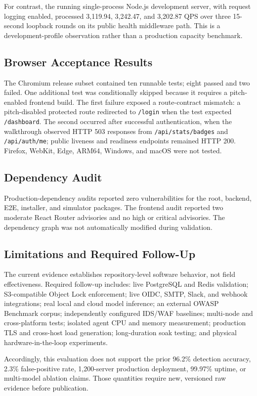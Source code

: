 For contrast, the running single-process Node.js development server, with request logging enabled, processed 3,119.94, 3,242.47, and 3,202.87 QPS over three 15-second loopback rounds on its public health middleware path. This is a development-profile observation rather than a production capacity benchmark.

\subsection{Browser Acceptance Results}
\label{subsec:browser-results}

The Chromium release subset contained ten runnable tests; eight passed and two failed. One additional test was conditionally skipped because it requires a pitch-enabled frontend build. The first failure exposed a route-contract mismatch: a pitch-disabled protected route redirected to \texttt{/login} when the test expected \texttt{/dashboard}. The second occurred after successful authentication, when the walkthrough observed HTTP 503 responses from \texttt{/api/stats/badges} and \texttt{/api/auth/me}; public liveness and readiness endpoints remained HTTP 200. Firefox, WebKit, Edge, ARM64, Windows, and macOS were not tested.

\subsection{Dependency Audit}
\label{subsec:dependency-audit}

Production-dependency audits reported zero vulnerabilities for the root, backend, E2E, installer, and simulator packages. The frontend audit reported two moderate React Router advisories and no high or critical advisories. The dependency graph was not automatically modified during validation.

\subsection{Limitations and Required Follow-Up}
\label{subsec:limitations}

The current evidence establishes repository-level software behavior, not field effectiveness. Required follow-up includes: live PostgreSQL and Redis validation; S3-compatible Object Lock enforcement; live OIDC, SMTP, Slack, and webhook integrations; real local and cloud model inference; an external OWASP Benchmark corpus; independently configured IDS/WAF baselines; multi-node and cross-platform tests; isolated agent CPU and memory measurement; production TLS and cross-host load generation; long-duration soak testing; and physical hardware-in-the-loop experiments.

Accordingly, this evaluation does not support the prior 96.2\% detection accuracy, 2.3\% false-positive rate, 1,200-server production deployment, 99.97\% uptime, or multi-model ablation claims. Those quantities require new, versioned raw evidence before publication.
